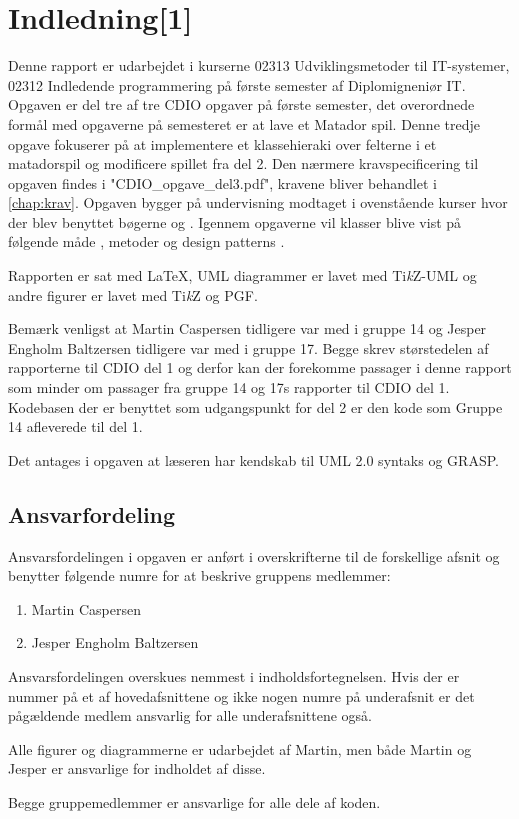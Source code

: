 \chapter{Indledning[1]}\label{chap:indledning}
Denne rapport er udarbejdet i kurserne 02313 Udviklingsmetoder til IT-systemer, 02312 Indledende programmering på første semester af Diplomigneniør IT. Opgaven er del tre af tre CDIO opgaver på første semester, det overordnede formål med opgaverne på semesteret er at lave et Matador spil. Denne tredje opgave fokuserer på at implementere et klassehieraki over felterne i et matadorspil og modificere spillet fra del 2. Den nærmere kravspecificering til opgaven findes i "CDIO\_opgave\_del3.pdf"\cite{CDIOdel3}, kravene bliver behandlet i \vref{chap:krav}. Opgaven bygger på undervisning modtaget i ovenstående kurser hvor der blev benyttet bøgerne \cite{umlbook} og \cite{javabook}. Igennem opgaverne vil klasser blive vist på følgende måde , metoder  og design patterns .

Rapporten er sat med \LaTeX, UML diagrammer er lavet med Ti\emph{k}Z-UML og andre figurer er lavet med Ti\emph{k}Z og \textsc{PGF}.

Bemærk venligst at Martin Caspersen tidligere var med i gruppe 14 og Jesper Engholm Baltzersen tidligere var med i gruppe 17. Begge skrev størstedelen af rapporterne til CDIO del 1 og derfor kan der forekomme passager i denne rapport som minder om passager fra gruppe 14 og 17s rapporter til CDIO del 1. Kodebasen der er benyttet som udgangspunkt for del 2 er den kode som Gruppe 14 afleverede til del 1.

Det antages i opgaven at læseren har kendskab til UML 2.0 syntaks og GRASP.

\section{Ansvarfordeling}\label{sec:indledning:ansvarsfordeling}

Ansvarsfordelingen i opgaven er anført i overskrifterne til de forskellige afsnit og benytter følgende numre for at beskrive gruppens medlemmer:
\begin{enumerate}
\item Martin Caspersen
\item Jesper Engholm Baltzersen
\end{enumerate}
Ansvarsfordelingen overskues nemmest i indholdsfortegnelsen. Hvis der er nummer på et af hovedafsnittene og ikke nogen numre på underafsnit er det pågældende medlem ansvarlig for alle underafsnittene også.

Alle figurer og diagrammerne er udarbejdet af Martin, men både Martin og Jesper er ansvarlige for indholdet af disse.

Begge gruppemedlemmer er ansvarlige for alle dele af koden.